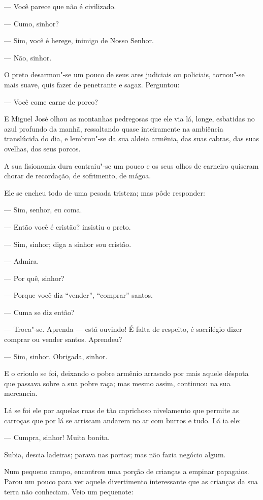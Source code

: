 --- Você parece que não é civilizado.

--- Cumo, sinhor?

--- Sim, você é herege, inimigo de Nosso Senhor.

--- Não, sinhor.

O preto desarmou"-se um pouco de seus ares judiciais ou policiais,
tornou"-se mais suave, quis fazer de penetrante e sagaz. Perguntou:

--- Você come carne de porco?

E Miguel José olhou as montanhas pedregosas que ele via lá, longe,
esbatidas no azul profundo da manhã, ressaltando quase inteiramente na
ambiência translúcida do dia, e lembrou"-se da sua aldeia armênia, das
suas cabras, das suas ovelhas, dos seus porcos.

A sua fisionomia dura contraiu"-se um pouco e os seus olhos de carneiro
quiseram chorar de recordação, de sofrimento, de mágoa.

Ele se encheu todo de uma pesada tristeza; mas pôde responder:

--- Sim, senhor, eu coma.

--- Então você é cristão? insistiu o preto.

--- Sim, sinhor; diga a sinhor sou cristão.

--- Admira.

--- Por quê, sinhor?

--- Porque você diz ``vender'', ``comprar'' santos.

--- Cuma se diz então?

--- Troca"-se. Aprenda --- está ouvindo! É falta de respeito, é
sacrilégio dizer comprar ou vender santos. Aprendeu?

--- Sim, sinhor. Obrigada, sinhor.

E o crioulo se foi, deixando o pobre armênio arrasado por mais aquele
déspota que passava sobre a sua pobre raça; mas mesmo assim, continuou
na sua mercancia.

Lá se foi ele por aquelas ruas de tão caprichoso nivelamento que permite
as carroças que por lá se arriscam andarem no ar com burros e tudo. Lá
ia ele:

--- Cumpra, sinhor! Muita bonita.

Subia, descia ladeiras; parava nas portas; mas não fazia negócio algum.

Num pequeno campo, encontrou uma porção de crianças a empinar papagaios.
Parou um pouco para ver aquele divertimento interessante que as crianças
da sua terra não conheciam. Veio um pequenote:

